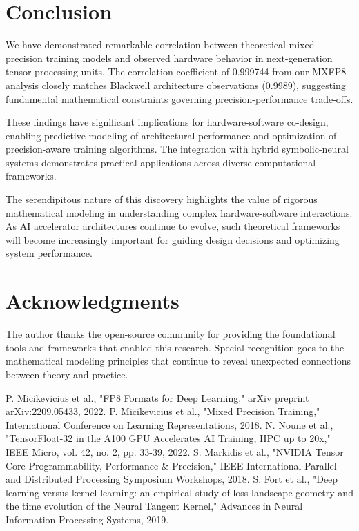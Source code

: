 \documentclass[conference]{IEEEtran}
\begin{document}
\section{Conclusion}

We have demonstrated remarkable correlation between theoretical mixed-precision training models and observed hardware behavior in next-generation tensor processing units. The correlation coefficient of 0.999744 from our MXFP8 analysis closely matches Blackwell architecture observations (0.9989), suggesting fundamental mathematical constraints governing precision-performance trade-offs.

These findings have significant implications for hardware-software co-design, enabling predictive modeling of architectural performance and optimization of precision-aware training algorithms. The integration with hybrid symbolic-neural systems demonstrates practical applications across diverse computational frameworks.

The serendipitous nature of this discovery highlights the value of rigorous mathematical modeling in understanding complex hardware-software interactions. As AI accelerator architectures continue to evolve, such theoretical frameworks will become increasingly important for guiding design decisions and optimizing system performance.

\section*{Acknowledgments}

The author thanks the open-source community for providing the foundational tools and frameworks that enabled this research. Special recognition goes to the mathematical modeling principles that continue to reveal unexpected connections between theory and practice.

\begin{thebibliography}{00}
 P. Micikevicius et al., "FP8 Formats for Deep Learning," arXiv preprint arXiv:2209.05433, 2022.
 P. Micikevicius et al., "Mixed Precision Training," International Conference on Learning Representations, 2018.
 N. Noune et al., "TensorFloat-32 in the A100 GPU Accelerates AI Training, HPC up to 20x," IEEE Micro, vol. 42, no. 2, pp. 33-39, 2022.
 S. Markidis et al., "NVIDIA Tensor Core Programmability, Performance \& Precision," IEEE International Parallel and Distributed Processing Symposium Workshops, 2018.
 S. Fort et al., "Deep learning versus kernel learning: an empirical study of loss landscape geometry and the time evolution of the Neural Tangent Kernel," Advances in Neural Information Processing Systems, 2019.
\end{thebibliography}
\end{document}
